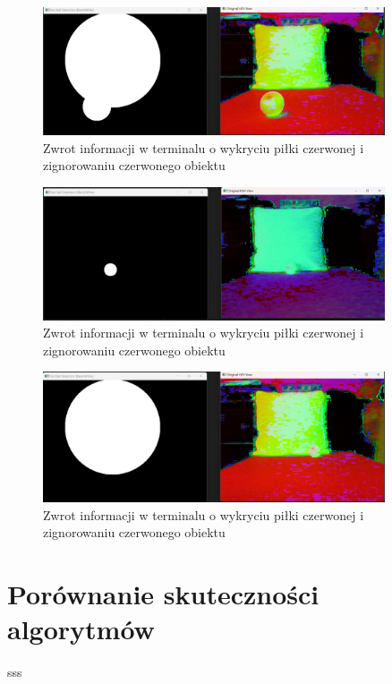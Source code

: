 \documentclass[a4paper,twoside,12pt]{book}
\begin{document}
\begin{figure}[h]
    \centering
    \includegraphics[width=0.9\textwidth]{Images/Porownanie/Binaryzacja/Zrzut ekranu 2025-01-02 193858.png}
    \caption{Zwrot informacji w terminalu o wykryciu piłki czerwonej i zignorowaniu czerwonego obiektu}
    \label{fig:Wykrycie piłki5}
\end{figure}
\begin{figure}[h]
    \centering
    \includegraphics[width=0.9\textwidth]{Images/Porownanie/Binaryzacja/Zrzut ekranu 2025-01-02 193817.png}
    \caption{Zwrot informacji w terminalu o wykryciu piłki czerwonej i zignorowaniu czerwonego obiektu}
    \label{fig:Wykrycie piłki5}
\end{figure}
\begin{figure}[h]
    \centering
    \includegraphics[width=0.9\textwidth]{Images/Porownanie/Binaryzacja/Zrzut ekranu 2025-01-02 193917.png}
    \caption{Zwrot informacji w terminalu o wykryciu piłki czerwonej i zignorowaniu czerwonego obiektu}
    \label{fig:Wykrycie piłki5}
\end{figure}
\section{Porównanie skuteczności algorytmów}
sss
\end{document}
